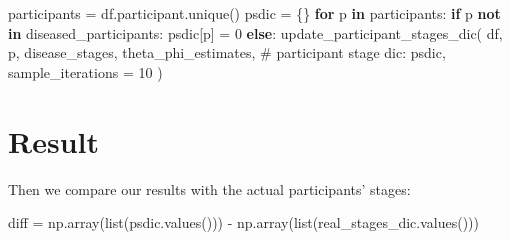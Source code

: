 \documentclass[
  letterpaper,
  DIV=11,
  numbers=noendperiod]{scrreprt}
\newenvironment{Shaded}{\begin{snugshade}}{\end{snugshade}}
\newcommand{\BuiltInTok}[1]{\textcolor[rgb]{0.00,0.23,0.31}{#1}}
\newcommand{\CommentTok}[1]{\textcolor[rgb]{0.37,0.37,0.37}{#1}}
\newcommand{\ControlFlowTok}[1]{\textcolor[rgb]{0.00,0.23,0.31}{\textbf{#1}}}
\newcommand{\DecValTok}[1]{\textcolor[rgb]{0.68,0.00,0.00}{#1}}
\newcommand{\KeywordTok}[1]{\textcolor[rgb]{0.00,0.23,0.31}{\textbf{#1}}}
\newcommand{\NormalTok}[1]{\textcolor[rgb]{0.00,0.23,0.31}{#1}}
\newcommand{\OperatorTok}[1]{\textcolor[rgb]{0.37,0.37,0.37}{#1}}
\begin{document}
\begin{Shaded}
\begin{Highlighting}[]
\NormalTok{participants }\OperatorTok{=}\NormalTok{ df.participant.unique()}
\NormalTok{psdic }\OperatorTok{=}\NormalTok{ \{\}}
\ControlFlowTok{for}\NormalTok{ p }\KeywordTok{in}\NormalTok{ participants:}
    \ControlFlowTok{if}\NormalTok{ p }\KeywordTok{not} \KeywordTok{in}\NormalTok{ diseased\_participants:}
\NormalTok{        psdic[p] }\OperatorTok{=} \DecValTok{0}
    \ControlFlowTok{else}\NormalTok{:}
\NormalTok{        update\_participant\_stages\_dic(}
\NormalTok{            df,}
\NormalTok{            p,}
\NormalTok{            disease\_stages,}
\NormalTok{            theta\_phi\_estimates,}
            \CommentTok{\# participant stage dic:}
\NormalTok{            psdic,}
\NormalTok{            sample\_iterations }\OperatorTok{=} \DecValTok{10}
\NormalTok{    )}
\end{Highlighting}
\end{Shaded}

\section{Result}\label{result}

Then we compare our results with the actual participants' stages:

\begin{Shaded}
\begin{Highlighting}[]
\NormalTok{diff }\OperatorTok{=}\NormalTok{ np.array(}\BuiltInTok{list}\NormalTok{(psdic.values())) }\OperatorTok{{-}}\NormalTok{ np.array(}\BuiltInTok{list}\NormalTok{(real\_stages\_dic.values()))}
\end{Highlighting}
\end{Shaded}
\end{document}
